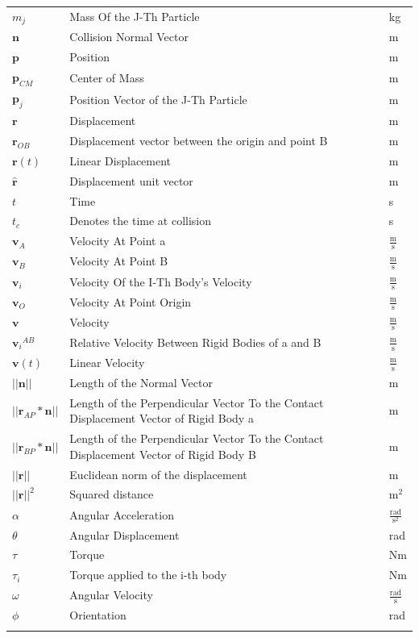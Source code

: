 \documentclass[12pt]{article}
\begin{document}
\begin{longtabu}{l X[l] l}
${m_{j}}$ & Mass Of the J-Th Particle & kg
\\
$\mathbf{n}$ & Collision Normal Vector & m
\\
$\mathbf{p}$ & Position & m
\\
${\mathbf{p}_{CM}}$ & Center of Mass & m
\\
${\mathbf{p}_{j}}$ & Position Vector of the J-Th Particle & m
\\
$\mathbf{r}$ & Displacement & m
\\
${\mathbf{r}_{OB}}$ & Displacement vector between the origin and point B & m
\\
$\mathbf{r}(t)$ & Linear Displacement & m
\\
$\mathbf{\hat{r}}$ & Displacement unit vector & m
\\
$t$ & Time & s
\\
${t_{c}}$ & Denotes the time at collision & s
\\
${\mathbf{v}_{A}}$ & Velocity At Point a & $\frac{\text{m}}{\text{s}}$
\\
${\mathbf{v}_{B}}$ & Velocity At Point B & $\frac{\text{m}}{\text{s}}$
\\
${\mathbf{v}_{i}}$ & Velocity Of the I-Th Body's Velocity & $\frac{\text{m}}{\text{s}}$
\\
${\mathbf{v}_{O}}$ & Velocity At Point Origin & $\frac{\text{m}}{\text{s}}$
\\
$\mathbf{v}$ & Velocity & $\frac{\text{m}}{\text{s}}$
\\
${{\mathbf{v}_{i}}^{AB}}$ & Relative Velocity Between Rigid Bodies of a and B & $\frac{\text{m}}{\text{s}}$
\\
$\mathbf{v}(t)$ & Linear Velocity & $\frac{\text{m}}{\text{s}}$
\\
$||\mathbf{n}||$ & Length of the Normal Vector & m
\\
$||{\mathbf{r}_{AP}}*\mathbf{n}||$ & Length of the Perpendicular Vector To the Contact Displacement Vector of Rigid Body a & m
\\
$||{\mathbf{r}_{BP}}*\mathbf{n}||$ & Length of the Perpendicular Vector To the Contact Displacement Vector of Rigid Body B & m
\\
$||\mathbf{r}||$ & Euclidean norm of the displacement & m
\\
${||\mathbf{r}||^{2}}$ & Squared distance & $\text{m}^{2}$
\\
$α$ & Angular Acceleration & $\frac{\text{rad}}{\text{s}^{2}}$
\\
$θ$ & Angular Displacement & rad
\\
$τ$ & Torque & Nm
\\
${τ_{i}}$ & Torque applied to the i-th body & Nm
\\
$ω$ & Angular Velocity & $\frac{\text{rad}}{\text{s}}$
\\
$ϕ$ & Orientation & rad
\\
\bottomrule
\label{Table:ToS}
\end{longtabu}
\end{document}
